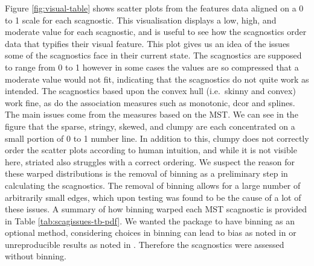 Figure \ref{fig:visual-table} shows scatter plots from the features data
aligned on a 0 to 1 scale for each scagnostic. This visualisation
displays a low, high, and moderate value for each scagnostic, and is
useful to see how the scagnostics order data that typifies their visual
feature. This plot gives us an idea of the issues some of the
scagnostics face in their current state. The scagnostics are supposed to
range from 0 to 1 however in some cases the values are so compressed
that a moderate value would not fit, indicating that the scagnostics do
not quite work as intended. The scagnostics based upon the convex hull
(i.e.~skinny and convex) work fine, as do the association measures such
as monotonic, dcor and splines. The main issues come from the measures
based on the MST. We can see in the figure that the sparse, stringy,
skewed, and clumpy are each concentrated on a small portion of 0 to 1
number line. In addition to this, clumpy does not correctly order the
scatter plots according to human intuition, and while it is not visible
here, striated also struggles with a correct ordering. We suspect the
reason for these warped distributions is the removal of binning as a
preliminary step in calculating the scagnostics. The removal of binning
allows for a large number of arbitrarily small edges, which upon testing
was found to be the cause of a lot of these issues. A summary of how
binning warped each MST scagnostic is provided in Table
\ref{tab:scagissues-tb-pdf}. We wanted the package to have binning as an
optional method, considering choices in binning can lead to bias as
noted in \citet{scagdist} or unreproducible results as noted in
\citet{robust}. Therefore the scagnostics were assessed without binning.

